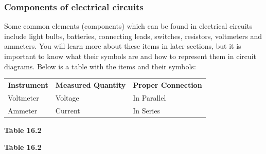             \subsubsection{ Components of electrical circuits}
            \nopagebreak
          \label{m38771*id62821}Some common elements (components) which can be found in electrical circuits include light bulbs, batteries, connecting leads, switches, resistors, voltmeters and ammeters. You will learn more about these items in later sections, but it is important to know what their symbols are and how to represent them in circuit diagrams. Below is a table with the items and their symbols:\par 
          \begin{table}[H]
        \begin{center}
      \label{m38773*id67892}
    \noindent
      \tablelasttail{}
      \begin{xtabular}[t]{|l|l|l|}\hline
                  \textbf{Instrument}
                 &
                  \textbf{Measured Quantity}
                 &
                  \textbf{Proper Connection}
     \tabularnewline{}
        Voltmeter &
        Voltage &
        In Parallel%
     \tabularnewline{}
        Ammeter &
        Current &
        In Series%
     \tabularnewline{}
    \end{xtabular}
      \end{center}
    \begin{center}{\small\bfseries Table 16.2}\end{center}
    \begin{caption}{\small\bfseries Table 16.2}\end{caption}
\end{table}
    \par
  \label{m38773**end}
